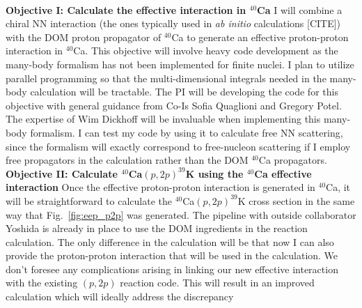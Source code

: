 \documentclass[12pt]{article}
\begin{document}
\\
\textbf{Objective I: Calculate the effective interaction in $^{40}$Ca}
I will combine a chiral NN interaction (the ones typically used in \textit{ab initio} calculations [CITE]) with the DOM
proton propagator of $^{40}$Ca to generate an effective proton-proton interaction in $^{40}$Ca. This objective will involve
heavy code development as the many-body formalism has not been implemented for finite nuclei. I plan to utilize parallel
programming so that the multi-dimensional integrals needed in the many-body calculation will be tractable. The PI will be
developing the code for this objective with general guidance from Co-Is Sofia Quaglioni and Gregory Potel. The expertise of
Wim Dickhoff will be invaluable when implementing this many-body formalism. I can test my code by using it to calculate free
NN scattering, since the formalism will exactly correspond to free-nucleon scattering if I employ free propagators in the
calculation rather than the DOM $^{40}$Ca propagators.
\\
\textbf{Objective II: Calculate $^{40}$Ca$(p,2p)^{39}$K using the $^{40}$Ca effective interaction}
Once the effective proton-proton interaction is generated in $^{40}$Ca, it will be straightforward to calculate the $^{40}$Ca$(p,2p)^{39}$K cross section in the same way that
Fig.~\ref{fig:eep_p2p} was generated. The pipeline with outside collaborator Yoshida is already in place to use the DOM ingredients in the reaction calculation.
The only difference in the calculation will be that now I can also provide the proton-proton interaction that will be used in the calculation. We don't foresee any complications
arising in linking our new effective interaction with the existing $(p,2p)$ reaction code. This will result in an improved calculation which will ideally address the discrepancy
\end{document}
